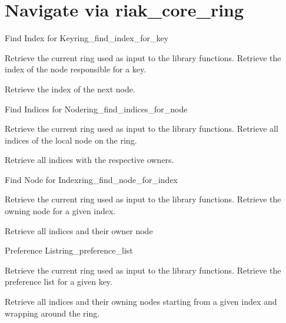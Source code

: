 \section{Navigate via riak\_core\_ring}

\begin{actionbox}{Find Index for Key}{ring_find_index_for_key}
	\begin{action}
		 Retrieve the current ring used as input  to the library functions.
		 Retrieve the index of the node responsible for a key.
		\begin{action}
			 Retrieve the index of the next node.
		\end{action}
	\end{action}
\end{actionbox}

\begin{actionbox}{Find Indices for Node}{ring_find_indices_for_node}
	\begin{action}
		 Retrieve the current ring used as input  to the library functions.
		 Retrieve all indices of the local node on the ring.
		\begin{action}
			 Retrieve all indices with the respective owners.
		\end{action}
	\end{action}
\end{actionbox}

\begin{actionbox}{Find Node for Index}{ring_find_node_for_index}
	\begin{action}
		 Retrieve the current ring used as input  to the library functions.
		 Retrieve the owning node for a given index.
		\begin{action}
			 Retrieve all indices and their owner node
		\end{action}
	\end{action}
\end{actionbox}

\begin{actionbox}{Preference List}{ring_preference_list}
	\begin{action}
		 Retrieve the current ring used as input  to the library functions.
		 Retrieve the preference list for a given key.
		\begin{action}
			 Retrieve all indices and their owning nodes starting from a given index and wrapping around the ring.
		\end{action}
	\end{action}
\end{actionbox}

